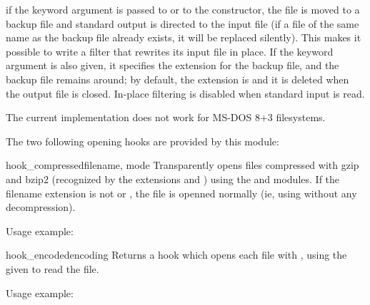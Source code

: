  if the keyword argument
 is passed to  or to the
 constructor, the file is moved to a backup file and
standard output is directed to the input file (if a file of the same
name as the backup file already exists, it will be replaced silently).
This makes it possible to write a filter that rewrites its input file
in place.  If the keyword argument  is also given, it specifies the extension for the backup
file, and the backup file remains around; by default, the extension is
 and it is deleted when the output file is closed.  In-place
filtering is disabled when standard input is read.

 The current implementation does not work for MS-DOS
8+3 filesystems.


The two following opening hooks are provided by this module:

\begin{funcdesc}{hook_compressed}{filename, mode}
  Transparently opens files compressed with gzip and bzip2 (recognized
  by the extensions  and ) using the 
  and  modules.  If the filename extension is not 
  or , the file is openned normally (ie,
  using  without any decompression).

  Usage example: 

\end{funcdesc}

\begin{funcdesc}{hook_encoded}{encoding}
  Returns a hook which opens each file with ,
  using the given  to read the file.

  Usage example:

\end{funcdesc}

